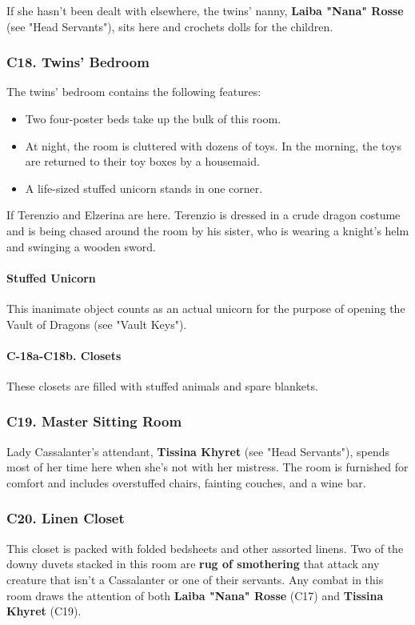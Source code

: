 \documentclass[10pt,a4paper,twoside,twocolumn,openany,nodeprecatedcode]{dndbook}
\begin{document}
If she hasn't been dealt with elsewhere, the twins' nanny, \textbf{Laiba "Nana" Rosse} (see "Head Servants"), sits here and crochets dolls for the children.
\subsubsection{C18. Twins' Bedroom}
The twins' bedroom contains the following features:
\begin{itemize}

\item Two four-poster beds take up the bulk of this room.
\item At night, the room is cluttered with dozens of toys. In the morning, the toys are returned to their toy boxes by a housemaid.
\item A life-sized stuffed unicorn stands in one corner.
\end{itemize}


If Terenzio and Elzerina are here. Terenzio is dressed in a crude dragon costume and is being chased around the room by his sister, who is wearing a knight's helm and swinging a wooden sword.
\paragraph{Stuffed Unicorn}
This inanimate object counts as an actual unicorn for the purpose of opening the Vault of Dragons (see "Vault Keys").
\paragraph{C-18a-C18b. Closets}
These closets are filled with stuffed animals and spare blankets.
\subsubsection{C19. Master Sitting Room}
Lady Cassalanter's attendant, \textbf{Tissina Khyret} (see "Head Servants"), spends most of her time here when she's not with her mistress. The room is furnished for comfort and includes overstuffed chairs, fainting couches, and a wine bar.
\subsubsection{C20. Linen Closet}
This closet is packed with folded bedsheets and other assorted linens. Two of the downy duvets stacked in this room are \textbf{rug of smothering} that attack any creature that isn't a Cassalanter or one of their servants. Any combat in this room draws the attention of both \textbf{Laiba "Nana" Rosse} (C17) and \textbf{Tissina Khyret} (C19).
\end{document}
